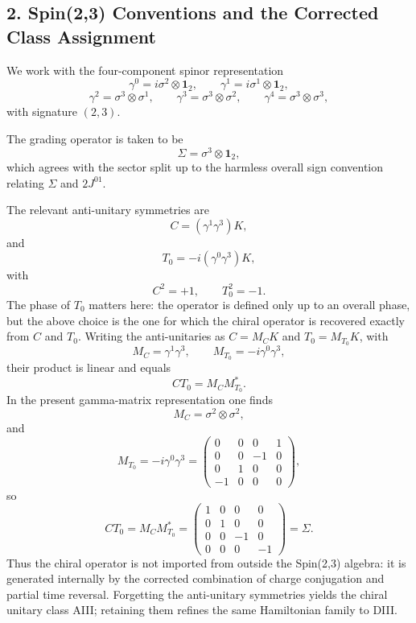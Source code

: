 \documentclass[
]{article}
\begin{document}
\subsection{2. Spin(2,3) Conventions and the Corrected Class
Assignment}\label{spin23-conventions-and-the-corrected-class-assignment}

We work with the four-component spinor representation \[
\gamma^0 = i \sigma^2 \otimes \mathbf{1}_2, \qquad
\gamma^1 = i \sigma^1 \otimes \mathbf{1}_2,
\] \[
\gamma^2 = \sigma^3 \otimes \sigma^1, \qquad
\gamma^3 = \sigma^3 \otimes \sigma^2, \qquad
\gamma^4 = \sigma^3 \otimes \sigma^3,
\] with signature \((2,3)\).

The grading operator is taken to be \[
\Sigma = \sigma^3 \otimes \mathbf{1}_2,
\] which agrees with the sector split up to the harmless overall sign
convention relating \(\Sigma\) and \(2J^{01}\).

The relevant anti-unitary symmetries are \[
C = (\gamma^1 \gamma^3)K,
\] and \[
T_0 = -i(\gamma^0 \gamma^3)K,
\] with \[
C^2 = +1, \qquad T_0^2 = -1.
\] The phase of \(T_0\) matters here: the operator is defined only up to
an overall phase, but the above choice is the one for which the chiral
operator is recovered exactly from \(C\) and \(T_0\). Writing the
anti-unitaries as \(C = M_C K\) and \(T_0 = M_{T_0}K\), with \[
M_C = \gamma^1\gamma^3,
\qquad
M_{T_0} = -i\gamma^0\gamma^3,
\] their product is linear and equals \[
CT_0 = M_C M_{T_0}^*.
\] In the present gamma-matrix representation one finds \[
M_C = \sigma^2 \otimes \sigma^2,
\] and \[
M_{T_0}
= -i\gamma^0\gamma^3
=
\begin{pmatrix}
0 & 0 & 0 & 1 \\
0 & 0 & -1 & 0 \\
0 & 1 & 0 & 0 \\
-1 & 0 & 0 & 0
\end{pmatrix},
\] so \[
CT_0
= M_C M_{T_0}^*
=
\begin{pmatrix}
1 & 0 & 0 & 0 \\
0 & 1 & 0 & 0 \\
0 & 0 & -1 & 0 \\
0 & 0 & 0 & -1
\end{pmatrix}
= \Sigma.
\] Thus the chiral operator is not imported from outside the Spin(2,3)
algebra: it is generated internally by the corrected combination of
charge conjugation and partial time reversal. Forgetting the
anti-unitary symmetries yields the chiral unitary class AIII; retaining
them refines the same Hamiltonian family to DIII.
\end{document}
